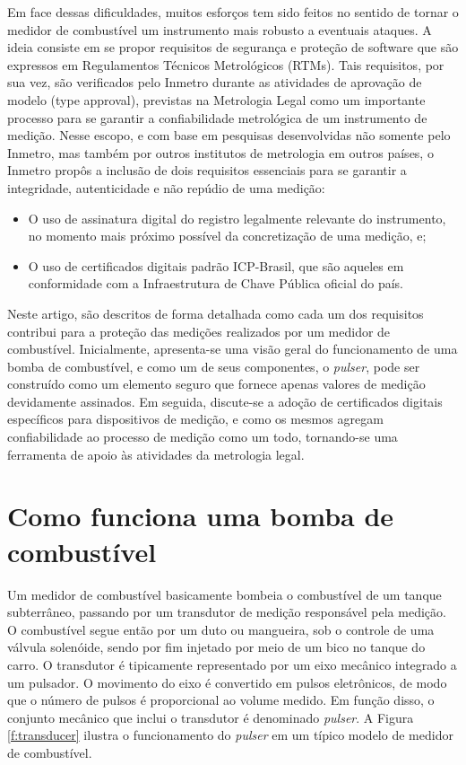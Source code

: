 \documentclass[12pt]{article}
\begin{document}
Em face dessas dificuldades, muitos esforços tem sido feitos no sentido de tornar o medidor de combustível um instrumento mais robusto a eventuais ataques.
A ideia consiste em se propor requisitos de segurança e proteção de software que são expressos em Regulamentos Técnicos Metrológicos (RTMs).
Tais requisitos, por sua vez, são verificados pelo Inmetro durante as atividades de aprovação de modelo (type approval), previstas na Metrologia Legal como um importante processo para se garantir a confiabilidade metrológica de um instrumento de medição.
Nesse escopo, e com base em pesquisas desenvolvidas não somente pelo Inmetro, mas também por outros institutos de metrologia em outros países, o Inmetro propôs a inclusão de dois requisitos essenciais para se garantir a integridade, autenticidade e não repúdio de uma medição:

\begin{itemize}
    \item O uso de assinatura digital do registro legalmente relevante do instrumento, no momento mais próximo possível da concretização de uma medição, e;
    \item O uso de certificados digitais padrão ICP-Brasil, que são aqueles em conformidade com a Infraestrutura de Chave Pública oficial do país.
\end{itemize}

Neste artigo, são descritos de forma detalhada como cada um dos requisitos contribui para a proteção das medições realizados por um medidor de combustível.
Inicialmente, apresenta-se uma visão geral do funcionamento de uma bomba de combustível, e como um de seus componentes, o \textit{pulser}, pode ser construído como um elemento seguro que fornece apenas valores de medição devidamente assinados.
Em seguida, discute-se a adoção de certificados digitais específicos para dispositivos de medição, e como os mesmos agregam confiabilidade ao processo de medição como um todo, tornando-se uma ferramenta de apoio às atividades da metrologia legal.

\section{Como funciona uma bomba de combustível}
Um medidor de combustível basicamente bombeia o combustível de um tanque subterrâneo, passando por um transdutor de medição responsável pela medição.
O combustível segue então por um duto ou mangueira, sob o controle de uma válvula solenóide, sendo por fim injetado por meio de um bico no tanque do carro.
O transdutor é tipicamente representado por um eixo mecânico integrado a um pulsador.
O movimento do eixo é convertido em pulsos eletrônicos, de modo que o número de pulsos é proporcional ao volume medido.
Em função disso, o conjunto mecânico que inclui o transdutor é denominado \textit{pulser}.
A Figura \ref{f:transducer} ilustra o funcionamento do \textit{pulser} em um típico modelo de medidor de combustível.
\end{document}
